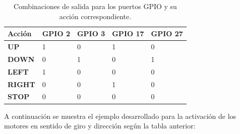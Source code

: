 \begin{table}[H]
  \begin{center}
    \begin{tabular}{|p{2.5cm}|p{2.5cm}|p{2.5cm}|p{2.5cm}|p{2.5cm}|}
      \hline
      {\textbf{Acción}} & \textbf{ GPIO 2 } & \textbf{ GPIO 3 } & \textbf{  GPIO 17 } & \textbf{ GPIO 27 }\\
      \hline
      { \textbf{ UP } } & { 1 } & { 0 }  & { 1 }  & { 0 }  \\
      \hline
      { \textbf{ DOWN } } & { 0 } & { 1 }  & { 0 }  & { 1 } \\
      \hline
      { \textbf{ LEFT } } & { 1 } & { 0 }  & { 0 }  & { 0 } \\
      \hline
      { \textbf{ RIGHT } } & { 0 } & { 0 }  & { 1 }  & { 0 } \\
      \hline
      { \textbf{ STOP } } & { 0 } & { 0 }  & { 0 }  & { 0 }  \\
     \hline   
    \end{tabular}
  \end{center}
\caption{ Combinaciones de salida para los puertos GPIO y su acción correspondiente. }
\end{table}

A continuación se muestra el ejemplo desarrollado para la activación de los motores en sentido de giro y dirección según la tabla anterior:\\


